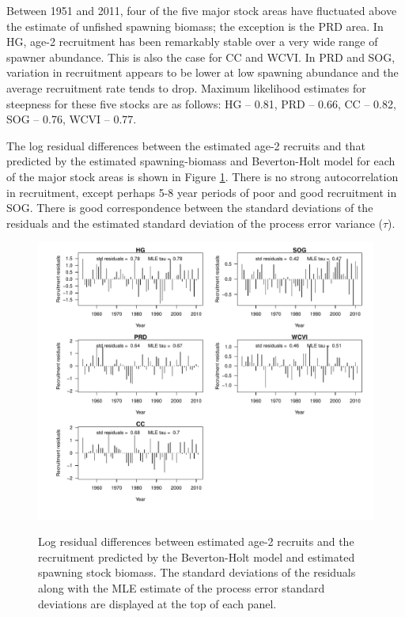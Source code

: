 Between 1951 and 2011, four of the five major stock areas have fluctuated above the estimate of unfished spawning biomass; the exception is the PRD area.  In HG, age-2 recruitment has been remarkably stable over a very wide range of spawner abundance. This is also the case for CC and WCVI.  In PRD and SOG, variation in recruitment appears to be lower at low spawning abundance and the average recruitment rate tends to drop.  Maximum likelihood estimates for steepness for these five stocks are as follows: HG -- 0.81, PRD -- 0.66, CC -- 0.82, SOG -- 0.76, WCVI -- 0.77.

The log residual differences between the estimated age-2 recruits and that predicted by the estimated spawning-biomass and Beverton-Holt model for each of the major stock areas is shown in Figure \ref{PartII:Results:RecResiduals}.  There is no strong autocorrelation in recruitment, except perhaps 5-8 year periods of poor and good recruitment in SOG.  There is good correspondence between the standard deviations of the residuals and the estimated standard deviation of the process error variance ($\tau$).

\begin{figure}[!tbp]
	\includegraphics[width=\textwidth]{../FIGS/qPriorFigs/iscam_fig_recresid.pdf}\\
	\caption{Log residual differences between estimated age-2 recruits and the recruitment predicted by the Beverton-Holt model and estimated spawning stock biomass.  The standard deviations of the residuals along with the MLE estimate of the process error standard deviations are displayed at the top of each panel.}\label{PartII:Results:RecResiduals}
\end{figure}
